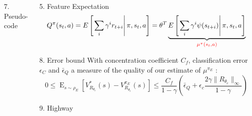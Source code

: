 \documentclass[xcolor=x11names,12pt]{beamer}
\begin{document}
\begin{frame}
\begin{columns}
\begin{column}{.48\textwidth}
\begin{block}{7. Pseudo-code}
{\begin{algorithm}[H]
        \end{algorithm}
      }
    \end{block}
  \end{column}
  \begin{column}{.48\textwidth}
    \begin{block}{5. Feature Expectation}
        \begin{equation*}
          Q^\pi(s_t,a) = E\left[\left.\sum\limits_{i}\gamma^i r_{t+i}\right|\pi,s_t,a\right] = \theta^T\underbrace{E\left[\left.\sum\limits_{i}\gamma^i \psi(s_{t+i})\right|\pi,s_t,a\right]}_{\color{red}\mu^\pi(s_t,a)}
        \end{equation*}
    \end{block}
    \vfill
    \begin{block}{8. Error bound}
      With concentration coefficient $C_f$, classification error $\epsilon_C$ and $\bar{\epsilon}_Q$ a measure of the quality of our estimate of $\mu^{\pi_E}$ :
      \begin{equation*}
        0\leq
        \mathop{E}_{s\sim\rho_E}[V^*_{R_{\theta_c}}(s)-V^{\pi_E}_{R_{\theta_c}}(s)]
        \leq \frac{C_f}{1-\gamma}\left(\bar{\epsilon}_Q +
        \epsilon_c\frac{2\gamma\|R_{\theta_c}\|_\infty}{1-\gamma}
        \right)
      \end{equation*}
    \end{block}
    \vfill
    \begin{block}{9. Highway}
      \begin{columns}
        \begin{column}{0.001\textwidth}
          \vspace{7cm}
        \end{column}
        \begin{column}{\textwidth}
          \centering
          \fontsize{11pt}{11pt}\selectfont

\end{column}
\end{columns}
\end{block}
\end{column}
\end{columns}
\end{frame}
\end{document}
